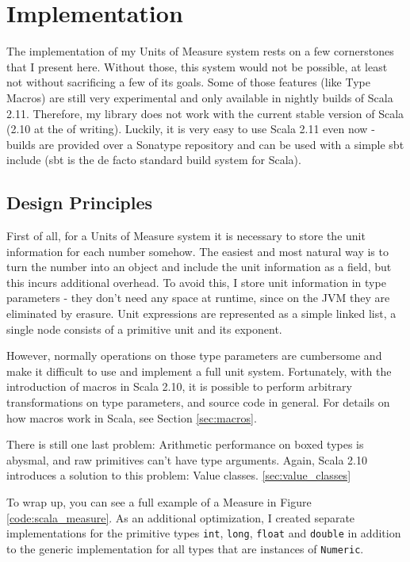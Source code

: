 \documentclass[12pt,oneside,a4paper]{scrbook}
\begin{document}
\chapter{Implementation}

The implementation of my Units of Measure system rests on a few cornerstones that I present here. Without those, this system would not be possible, at least not without sacrificing a few of its goals. Some of those features (like Type Macros) are still very experimental and only available in nightly builds of Scala 2.11. Therefore, my library does not work with the current stable version of Scala (2.10 at the of writing). Luckily, it is very easy to use Scala 2.11 even now - builds are provided over a Sonatype repository and can be used with a simple sbt include (sbt is the de facto standard build system for Scala).

\section{Design Principles}

First of all, for a Units of Measure system it is necessary to store the unit information for each number somehow. The easiest and most natural way is to turn the number into an object and include the unit information as a field, but this incurs additional overhead. To avoid this, I store unit information in type parameters - they don't need any space at runtime, since on the JVM they are eliminated by erasure. Unit expressions are represented as a simple linked list, a single node consists of a primitive unit and its exponent.

However, normally operations on those type parameters are cumbersome and make it difficult to use and implement a full unit system. Fortunately, with the introduction of macros in Scala 2.10, it is possible to perform arbitrary transformations on type parameters, and source code in general. For details on how macros work in Scala, see Section \ref{sec:macros}.

There is still one last problem: Arithmetic performance on boxed types is abysmal, and raw primitives can't have type arguments. Again, Scala 2.10 introduces a solution to this problem: Value classes. \ref{sec:value_classes}

To wrap up, you can see a full example of a Measure in Figure \ref{code:scala_measure}. As an additional optimization, I created separate implementations for the primitive types \verb|int|, \verb|long|, \verb|float| and \verb|double| in addition to the generic implementation for all types that are instances of \verb|Numeric|.
\end{document}
